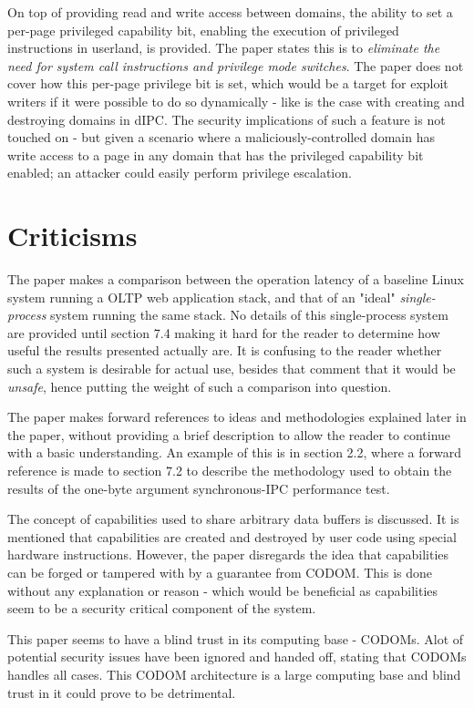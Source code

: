 \documentclass{article}
\begin{document}
On top of providing read and write access between domains, the ability to set a per-page privileged capability bit, enabling the execution of privileged instructions in userland, is provided. The paper states this is to \textit{eliminate the need for system call instructions and privilege mode switches}. The paper does not cover how this per-page privilege bit is set, which would be a target for exploit writers if it were possible to do so dynamically - like is the case with creating and destroying domains in dIPC. The security implications of such a feature is not touched on - but given a scenario where a maliciously-controlled domain has write access to a page in any domain that has the privileged capability bit enabled; an attacker could easily perform privilege escalation.


\section*{Criticisms}
The paper makes a comparison between the operation latency of a baseline Linux system running a OLTP web application stack, and that of an "ideal" \textit{single-process} system running the same stack. No details of this single-process system are provided until section 7.4 making it hard for the reader to determine how useful the results presented actually are. It is confusing to the reader whether such a system is desirable for actual use, besides that comment that it would be \textit{unsafe}, hence putting the weight of such a comparison into question.

The paper makes forward references to ideas and methodologies explained later in the paper, without providing a brief description to allow the reader to continue with a basic understanding. An example of this is in section 2.2, where a forward reference is made to section 7.2 to describe the methodology used to obtain the results of the one-byte argument synchronous-IPC performance test.

The concept of capabilities used to share arbitrary data buffers is discussed. It is mentioned that capabilities are created and destroyed by user code using special hardware instructions. However, the paper disregards the idea that capabilities can be forged or tampered with by a guarantee from CODOM. This is done without any explanation or reason - which would be beneficial as capabilities seem to be a security critical component of the system.

This paper seems to have a blind trust in its computing base - CODOMs. Alot of potential security issues have been ignored and handed off, stating that CODOMs handles all cases. This CODOM architecture is a large computing base and blind trust in it could prove to be detrimental.
\end{document}
